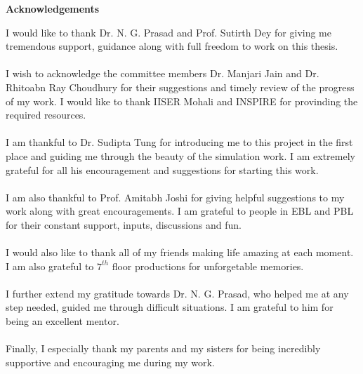 \begin{center}
\Large  {\bf Acknowledgements }
\end{center}
I would like to thank Dr. N. G. Prasad and Prof. Sutirth Dey for giving me tremendous support, guidance along with full freedom to work on this thesis. \\\\
I wish to acknowledge the committee members Dr. Manjari Jain and Dr. Rhitoabn Ray Choudhury for their suggestions and timely review of the progress of my work. I would like to thank IISER Mohali and INSPIRE for provinding the required resources.\\\\
I am thankful to Dr. Sudipta Tung for introducing me to this project in the first place and guiding me through the beauty of the simulation work. I am extremely grateful for all his encouragement and suggestions for starting this work.\\\\
I am also thankful to Prof. Amitabh Joshi for giving helpful suggestions to my work along with great encouragements. I am grateful to people in EBL and PBL for their constant support, inputs, discussions and fun.\\\\
I would also like to thank all of my friends making life amazing at each moment. I am also grateful to $7^{th}$ floor productions for unforgetable memories.\\\\
I further extend my gratitude towards Dr. N. G. Prasad, who helped me at any step needed, guided me through difficult situations. I am grateful to him for being an excellent mentor.\\\\
Finally, I especially thank my parents and my sisters for being incredibly supportive and encouraging me during my work.
\vfill
\cleardoublepage

